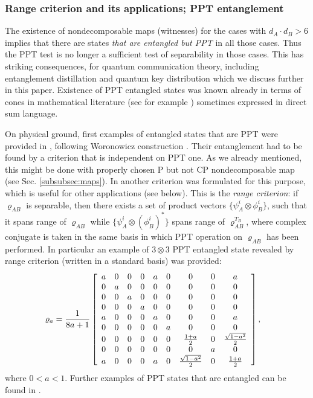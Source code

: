 \documentclass[rmp,12pt,preprint]{revtex4-2}
\begin{document}
\subsubsection{Range criterion and its applications; PPT entanglement
\label{subsubsec:RangePPT}}

The existence of nondecomposable maps (witnesses) for the cases with
$d_{A}\cdot d_{B}>6$ implies that there are states {\it that are
  entangled but PPT} in all those cases. Thus the PPT test is no
longer a sufficient test of separability in those cases. This has
striking consequences, for quantum communication theory, including
entanglement distillation and quantum key distribution which we
discuss further in this paper. Existence of PPT entangled states was
known already in terms of cones in mathematical literature (see for
example \cite{Choi82}) sometimes expressed in direct sum language.

On physical ground, first examples of entangled states that are PPT
were provided in \cite{Pawel97}, following Woronowicz construction
\cite{Woronowicz}. Their entanglement had to be found by a criterion
that is independent on PPT one. As we already mentioned, this might be
done with properly chosen P but not CP nondecomposable map (see
Sec. \ref{subsubsec:maps}). In \cite{Pawel97} another criterion was
formulated for this purpose, which is useful for other applications
(see below). This is the {\it range criterion}: if $\varrho_{AB}$ is
separable, then there exists a set of product vectors $\{ \psi_{A}^{i}
\otimes \phi_{B}^{i}\} $, such that it spans range of $\varrho_{AB}$
while $\{ \psi_{A}^{i} \otimes (\phi_{B}^{i})^{*}\}$ spans range of
$\varrho_{AB}^{T_{B}}$, where complex conjugate is taken in the same
basis in which PPT operation on $\varrho_{AB}$ has been performed. In
particular an example of $3 \otimes 3$ PPT entangled state revealed by
range criterion (written in a standard basis) was provided:
\begin{eqnarray}
\varrho_{a}={1 \over 8a + 1}
\left[ \begin{array}{ccccccccc}
     a &0&0&0&a&0&0&0& a   \\
      0&a&0&0&0&0&0&0&0     \\
      0&0&a&0&0&0&0&0&0     \\
      0&0&0&a&0&0&0&0&0     \\
     a &0&0&0&a&0&0&0& a     \\
      0&0&0&0&0&a&0&0&0     \\
0&0&0&0&0&0&{1+a \over 2}&0&{\sqrt{1-a^2} \over 2}\\
      0&0&0&0&0&0&0&a&0     \\
     a &0&0&0&a&0&{\sqrt{1-a^2} \over 2}&0&{1+a \over 2}\\
      \end{array}
    \right ], \ \ \
\label{tran}
\end{eqnarray}
where $0 < a < 1$. Further examples of PPT states that are entangled
can be found in \cite{Alber2001}.
\end{document}
